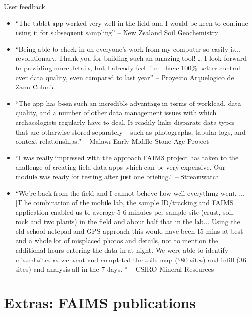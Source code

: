 \documentclass[aspectratio=169, 12pt]{beamer} %
\begin{document}
\begin{frame}[allowframebreaks]{User feedback}
    \begin{itemize}[label=\textbullet]
        \item ``The tablet app worked very well in the field and I would be keen to continue using it for subsequent sampling'' -- New Zealand Soil Geochemistry
        \item ``Being able to check in on everyone's work from my computer so easily is... revolutionary. Thank you for building such an amazing tool! …  I look forward to providing more details, but I already feel like I have 100\%{} better control over data quality, even compared to last year'' -- Proyecto Arquelogico de Zana Colonial
        \item ``The app has been such an incredible advantage in terms of workload, data quality, and a number of other data management issues with which archaeologists regularly have to deal. It readily links disparate data types that are otherwise stored separately – such as photographs, tabular logs, and context relationships.'' -- Malawi Early-Middle Stone Age Project
        \item ``I was really impressed with the approach FAIMS project has taken to the challenge of creating field data apps which can be very expensive. Our module was ready for testing after just one briefing.'' -- Streamwatch
        \item ``We’re back from the field and I cannot believe how well everything went. ... [T]he combination of the mobile lab, the sample ID/tracking and FAIMS application enabled us to average 5-6 minutes per sample site (crust, soil, rock and two plants)  in the field and about half that in the lab... Using the old school notepad and GPS approach this would have been 15 mins at best and a whole lot of misplaced photos and details, not to mention the additional hours entering the data in at night. We were able to identify missed sites as we went and completed the soils map (280 sites) and infill (36 sites) and analysis all in the 7 days. '' -- CSIRO Mineral Resources
    \end{itemize}
\end{frame}

\section{Extras: FAIMS publications}
\end{document}
